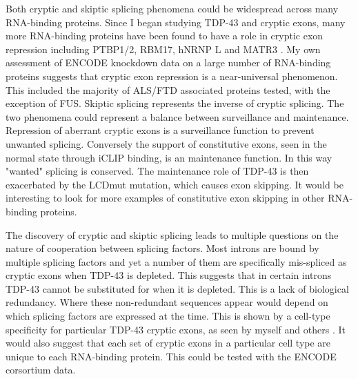 Both cryptic and skiptic splicing phenomena could be widespread across many RNA-binding proteins. 
Since I began studying TDP-43 and cryptic exons, many more RNA-binding proteins have been found to have a role in cryptic exon repression including PTBP1/2, RBM17, hNRNP L and MATR3 \citep{Ling2016,Tan2016,McClory2018,Attig2018}. 
My own assessment of ENCODE knockdown data on a large number of RNA-binding proteins suggests that cryptic exon repression is a near-universal phenomenon. 
This included the majority of ALS/FTD associated proteins tested, with the exception of FUS.
Skiptic splicing represents the inverse of cryptic splicing.
The two phenomena could represent a balance between surveillance and maintenance.
Repression of aberrant cryptic exons is a surveillance function to prevent unwanted splicing.
Conversely the support of constitutive exons, seen in the normal state through iCLIP binding, is an maintenance function.
In this way "wanted" splicing is conserved.
The maintenance role of TDP-43 is then exacerbated by the LCDmut mutation, which causes exon skipping. 
It would be interesting to look for more examples of constitutive exon skipping in other RNA-binding proteins.

The discovery of cryptic and skiptic splicing leads to multiple questions on the nature of cooperation between splicing factors.
Most introns are bound by multiple splicing factors and yet a number of them are specifically mis-spliced as cryptic exons when TDP-43 is depleted.
This suggests that in certain introns TDP-43 cannot be substituted for when it is depleted. 
This is a lack of biological redundancy. 
Where these non-redundant sequences appear would depend on which splicing factors are expressed at the time.
This is shown by a cell-type specificity for particular TDP-43 cryptic exons, as seen by myself and others \citep{Jeong2017}. 
It would also suggest that each set of cryptic exons in a particular cell type are unique to each RNA-binding protein.
This could be tested with the ENCODE corsortium data.

